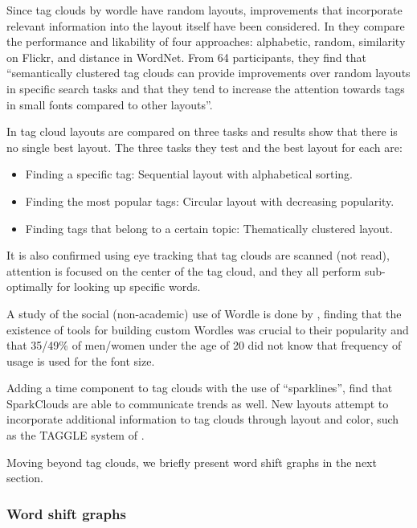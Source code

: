 {Since tag clouds by wordle have random layouts, improvements that incorporate relevant information into the layout itself have been considered.
In \cite{schrammel2009semantically} they compare the performance and likability of four approaches: alphabetic, random, similarity on Flickr, and distance in WordNet.
From 64 participants, they find that ``semantically clustered tag clouds can provide improvements over random layouts in specific search tasks and that they tend to increase the attention towards tags in small fonts compared to other layouts''.

In \cite{lohmann2009comparison} tag cloud layouts are compared on three tasks and results show that there is no single best layout.
The three tasks they test and the best layout for each are:
\begin{itemize}
\item Finding a specific tag: Sequential layout with alphabetical sorting.\vspace{-12pt}
\item Finding the most popular tags: Circular layout with decreasing popularity.\vspace{-12pt}
\item Finding tags that belong to a certain topic: Thematically clustered layout.
\end{itemize}
It is also confirmed using eye tracking that tag clouds are scanned (not read), attention is focused on the center of the tag cloud, and they all perform sub-optimally for looking up specific words.

A study of the social (non-academic) use of Wordle is done by \cite{viegas2009participatory}, finding that the existence of tools for building custom Wordles was crucial to their popularity and that 35/49\% of men/women under the age of 20 did not know that frequency of usage is used for the font size.

Adding a time component to tag clouds with the use of ``sparklines'', \cite{lee2010sparkclouds} find that SparkClouds are able to communicate trends as well.
New layouts attempt to incorporate additional information to tag clouds through layout and color, such as the TAGGLE system of \cite{emerson2015tag}.

Moving beyond tag clouds, we briefly present word shift graphs in the next section.

\subsubsection{Word shift graphs}

}
